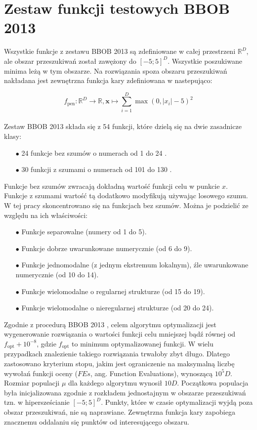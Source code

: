 \documentclass[a4paper,onecolumn,oneside,12pt,wide,floatssmall]{mwrep}
\theoremstyle{definition}
\theoremstyle{plain}%
\theoremstyle{remark}
\begin{document}
\section{Zestaw funkcji testowych BBOB 2013}
\label{sec:zestaw}

Wszystkie funkcje z zestawu BBOB 2013 są zdefiniowane w całej przestrzeni $\mathbb{R}^D$, ale obszar
przeszukiwań został zawężony do $[-5; 5]^D$. Wszystkie poszukiwane minima leżą w tym obszarze.
Na rozwiązania spoza obszaru przeszukiwań nakładana jest zewnętrzna funkcja kary zdefiniowana w \cite{setup} nastepująco: 

$$ f_\text{pen} : \mathbb{R}^D \rightarrow \mathbb{R}, 
\textbf{x} \mapsto \sum\limits_{i=1}^D \max\left(0, |x_i| - 5\right)^2 $$ 
\\
Zestaw BBOB 2013 składa się z 54 funkcji, które dzielą się na dwie zasadnicze klasy:

\begin{itemize}
 \item[$\bullet$] 24 funkcje bez szumów o numerach od 1 do 24 \cite{noiseless}. 
 \item[$\bullet$] 30 funkcji z szumami o numerach od 101 do 130 \cite{noisy}.
\end{itemize} 

Funkcje bez szumów zwracają dokładną wartość funkcji celu w punkcie $x$. Funkcje z szumami wartość tą dodatkowo modyfikują używając 
losowego szumu. W tej pracy skoncentrowano się na funkcjach bez szumów. Można je podzielić ze względu
na ich właściwości:

\begin{itemize}
 \item[$\bullet$] Funkcje separowalne (numery od 1 do 5).
 \item[$\bullet$] Funkcje dobrze uwarunkowane numerycznie (od 6 do 9).
 \item[$\bullet$] Funkcje jednomodalne (z jednym ekstremum lokalnym), źle uwarunkowane numerycznie (od 10 do 14).
 \item[$\bullet$] Funkcje wielomodalne o regularnej strukturze (od 15 do 19).
 \item[$\bullet$] Funkcje wielomodalne o nieregularnej strukturze (od 20 do 24).
\end{itemize} 

Zgodnie z procedurą BBOB 2013 \cite{setup}, 
celem algorytmu optymalizacji jest wygenerowanie rozwiązania o wartości funkcji celu mniejszej bądź 
równej od $f_\text{opt} + 10^{-8}$, gdzie $f_\text{opt}$ to minimum optymalizowanej funkcji. 
W wielu przypadkach znalezienie takiego rozwiązania trwałoby zbyt długo.
Dlatego zastosowano kryterium stopu,
jakim jest ograniczenie na maksymalną liczbę wywołań funkcji oceny ($FEs$, ang. Function Evaluations), wynoszącą $10^5D$. 
Rozmiar populacji $\mu$ dla każdego algorytmu wynosił $10D$. 
Początkowa populacja była inicjalizowana zgodnie z rozkładem jednostajnym w obszarze przeszukiwań tzn.
w hipersześcianie $[-5; 5]^D$. Punkty, które w czasie optymalizacji wyjdą poza obszar
przeszukiwań, nie są naprawiane. Zewnętrzna funkcja kary
zapobiega znacznemu oddalaniu się punktów od interesującego obszaru.
\end{document}

